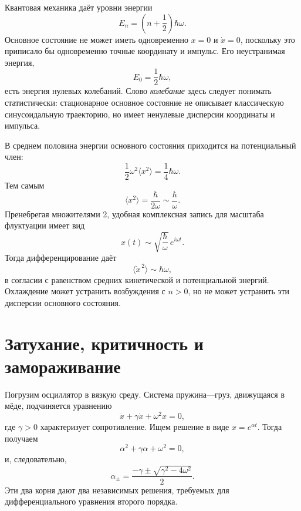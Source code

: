 Квантовая механика даёт уровни энергии
\begin{equation}
E_n=\left(n+\frac12\right)\hbar\omega.
\label{eq:c10-oscillator-levels}
\end{equation}
Основное состояние не может иметь одновременно \(x=0\) и \(\dot x=0\), поскольку это приписало бы одновременно точные координату и импульс. Его неустранимая энергия,
\[
E_0=\frac12\hbar\omega,
\]
есть энергия нулевых колебаний. Слово \emph{колебание} здесь следует понимать статистически: стационарное основное состояние не описывает классическую синусоидальную траекторию, но имеет ненулевые дисперсии координаты и импульса.

В среднем половина энергии основного состояния приходится на потенциальный член:
\[
\frac12\omega^2\langle x^2\rangle
=\frac14\hbar\omega.
\]
Тем самым
\begin{equation}
\langle x^2\rangle=\frac{\hbar}{2\omega}
\sim\frac{\hbar}{\omega}.
\label{eq:c10-zero-point-position}
\end{equation}
Пренебрегая множителями 2, удобная комплексная запись для масштаба флуктуации имеет вид
\[
x(t)\sim\sqrt{\frac{\hbar}{\omega}}\,e^{i\omega t}.
\]
Тогда дифференцирование даёт
\begin{equation}
\langle\dot x^{\,2}\rangle\sim\hbar\omega,
\label{eq:c10-zero-point-velocity}
\end{equation}
в согласии с равенством средних кинетической и потенциальной энергий. Охлаждение может устранить возбуждения с \(n>0\), но не может устранить эти дисперсии основного состояния.

\section{Затухание, критичность и замораживание}

Погрузим осциллятор в вязкую среду. Система пружина—груз, движущаяся в мёде, подчиняется уравнению
\begin{equation}
\ddot x+\gamma\dot x+\omega^2x=0,
\label{eq:c10-damped}
\end{equation}
где \(\gamma>0\) характеризует сопротивление. Ищем решение в виде \(x=e^{\alpha t}\). Тогда получаем
\begin{equation}
\alpha^2+\gamma\alpha+\omega^2=0,
\end{equation}
и, следовательно,
\begin{equation}
\alpha_\pm
=\frac{-\gamma\pm\sqrt{\gamma^2-4\omega^2}}{2}.
\label{eq:c10-damped-roots}
\end{equation}
Эти два корня дают два независимых решения, требуемых для дифференциального уравнения второго порядка.

